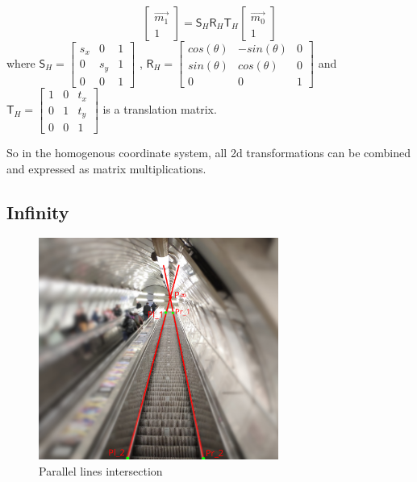 \begin{equation}
    \begin{bmatrix} \vec{m_1} \\ 1 \end{bmatrix} = 
    \pmb{\mathsf{S}}_H \pmb{\mathsf{R}}_H \pmb{\mathsf{T}}_H
    \begin{bmatrix} \vec{m_0} \\ 1 \end{bmatrix}    
\end{equation}
where 
$\pmb{\mathsf{S}}_H = \begin{bmatrix} s_x & 0 & 1\\ 0 & s_y & 1 \\ 0 & 0 & 1\end{bmatrix}$
, 
$\pmb{\mathsf{R}}_H = \begin{bmatrix} cos(\theta) & -sin(\theta) & 0 \\ sin(\theta) & cos(\theta) & 0 \\ 0 & 0 & 1 \end{bmatrix}$
and
$\pmb{\mathsf{T}}_H = \begin{bmatrix} 1 & 0 & t_x\\ 0 & 1 & t_y \\ 0 & 0 & 1 \end{bmatrix}$
is a translation matrix.

So in the homogenous coordinate system, all 2d transformations can be combined and expressed as matrix multiplications.

\subsection{Infinity}
\begin{figure}[h]
    \centering
    \includegraphics[width=0.7\textwidth]{graphics/parallel_intersection.jpg}
    \caption{Parallel lines intersection}
    \label{fig:intersection_parallel}
\end{figure}

